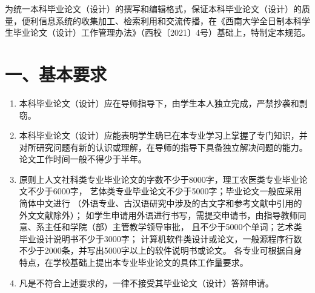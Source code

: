 \noindent 为统一本科毕业论文（设计）的撰写和编辑格式，保证本科毕业论文（设计）的质量，便利信息系统的收集加工、检索利用和交流传播，在《西南大学全日制本科学生毕业论文（设计）工作管理办法》（西校〔2021〕4号）基础上，特制定本规范。

\section*{一、基本要求}
\begin{enumerate}
  \item 本科毕业论文（设计）应在导师指导下，由学生本人独立完成，严禁抄袭和剽窃。
  \item 本科毕业论文（设计）应能表明学生确已在本专业学习上掌握了专门知识，并对所研究问题有新的认识或理解，在导师的指导下具备独立解决问题的能力。论文工作时间一般不得少于半年。
  \item 原则上人文社科类专业毕业论文的字数不少于8000字，理工农医类专业毕业论文不少于6000字，%
  艺体类专业毕业论文不少于5000字；毕业论文一般应采用简体中文进行%
  （外语专业、古汉语研究中涉及的古文字和参考文献中引用的外文文献除外）；%
  如学生申请用外语进行书写，需提交申请书，由指导教师同意、系主任和学院（部）主管教学领导审批，%
  且不少于5000个单词；艺术类毕业设计说明书不少于3000字；%
  计算机软件类设计或论文，一般源程序行数不少于2000条，并写出5000字以上的软件说明书或论文。%
  各专业可根据自身特点，在学校基础上提出本专业毕业论文的具体工作量要求。
  \item 凡是不符合上述要求的，一律不接受其毕业论文（设计）答辩申请。
\end{enumerate}

